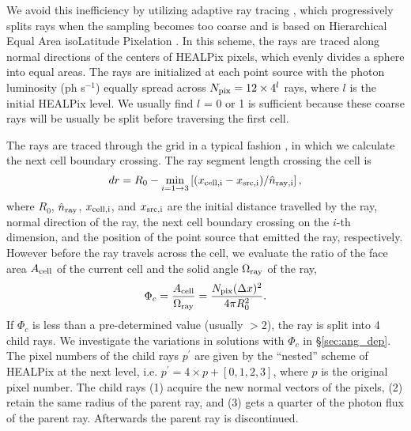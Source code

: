 \documentclass[12pt,preprint]{aastex}
\begin{document}
We avoid this inefficiency by utilizing adaptive ray tracing
\citep{Abel02_RT}, which progressively splits rays when the sampling
becomes too coarse and is based on Hierarchical Equal Area isoLatitude
Pixelation \citep[HEALPix;][]{HEALPix}.  In this scheme, the rays are
traced along normal directions of the centers of HEALPix pixels, which
evenly divides a sphere into equal areas.  The rays are initialized at
each point source with the photon luminosity (ph s$^{-1}$) equally
spread across $N_{\rm pix} = 12 \times 4^l$ rays, where $l$ is the
initial HEALPix level.  We usually find $l$ = 0 or 1 is sufficient
because these coarse rays will be usually be split before traversing
the first cell.

The rays are traced through the grid in a typical fashion
\citep[e.g.][]{Abel99_RT}, in which we calculate the next cell
boundary crossing.  The ray segment length crossing the cell is
%
\begin{equation}
  \label{eqn:trace}
  dr = R_0 - \min_{i=1 \rightarrow 3} \left[(x_{\rm cell,i} - x_{\rm src,i}) /
    \hat{n}_{\rm ray,i} \right],
\end{equation}
%
where $R_0$, $\hat{n}_{\rm ray}$, $x_{\rm cell,i}$, and $x_{\rm
  src,i}$ are the initial distance travelled by the ray, normal
direction of the ray, the next cell boundary crossing on the $i$-th
dimension, and the position of the point source that emitted the ray,
respectively.  However before the ray travels across the cell, we
evaluate the ratio of the face area $A_{\rm cell}$ of the current cell
and the solid angle $\Omega_{\rm ray}$ of the ray,
%
\begin{equation}
  \label{eqn:split}
  \Phi_c = \frac{A_{\rm cell}} {\Omega_{\rm ray}} = 
  \frac{N_{\rm pix} (\Delta x)^2} {4\pi R_0^2}.
\end{equation}
%
If $\Phi_c$ is less than a pre-determined value (usually $>2$), the
ray is split into 4 child rays.  We investigate the variations in
solutions with $\Phi_c$ in \S\ref{sec:ang_dep}.  The pixel numbers
of the child rays $p^\prime$ are given by the ``nested'' scheme of
HEALPix at the next level, i.e. $p^\prime = 4 \times p + [0,1,2,3]$,
where $p$ is the original pixel number.  The child rays (1) acquire
the new normal vectors of the pixels, (2) retain the same radius of
the parent ray, and (3) gets a quarter of the photon flux of the
parent ray.  Afterwards the parent ray is discontinued.
\end{document}
